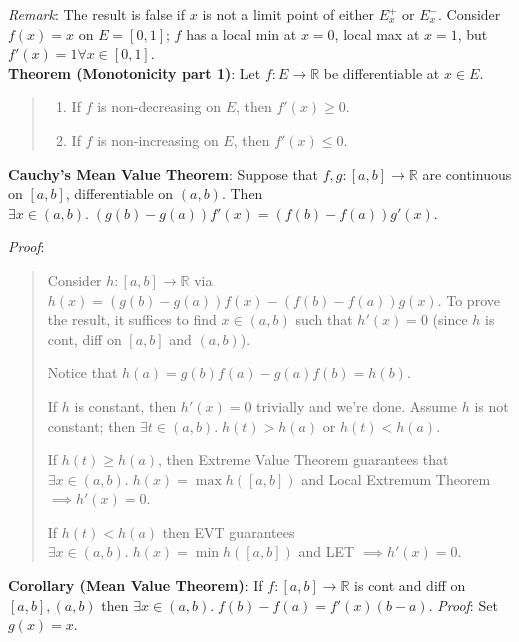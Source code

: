 \documentclass[11pt]{article}
\begin{document}
\emph{Remark}: The result is false if $x$ is not a limit point of either $E_x^+$ or $E_x^-$. Consider $f(x) = x$ on $E = [0,1]$; $f$ has a local min at $x = 0$, local max at $x = 1$, but $f'(x) = 1 \forall x \in [0, 1]$.\\

\textbf{Theorem (Monotonicity part 1)}: Let $f : E \to \mathbb{R}$ be differentiable at $x \in E$.
\begin{quote}\vspace{-0.3cm}
	\begin{enumerate}
	\item If $f$ is non-decreasing on $E$, then $f'(x) \geq 0$.
	\item If $f$ is non-increasing on $E$, then $f'(x) \leq 0$.
	\end{enumerate}
\end{quote}

\textbf{Cauchy's Mean Value Theorem}: Suppose that $f, g : [a,b] \to \mathbb{R}$ are continuous on $[a,b]$, differentiable on $(a,b)$. Then $\exists x \in (a,b).\; (g(b) - g(a)) f'(x) = (f(b) - f(a)) g'(x)$.

\emph{Proof}:
\begin{quote}\vspace{-0.3cm}
Consider $h : [a,b] \to \mathbb{R}$ via $h(x) = (g(b) - g(a)) f(x) - (f(b) - f(a)) g(x)$. To prove the result, it suffices to find $x \in (a,b)$ such that $h'(x) = 0$ (since $h$ is cont, diff on $[a,b]$ and $(a,b)$).

Notice that $h(a) = g(b) f(a) - g(a) f(b) = h(b)$.

If $h$ is constant, then $h'(x) = 0$ trivially and we're done. Assume $h$ is not constant; then $\exists t \in (a,b).\; h(t) > h(a)$ or $h(t) < h(a)$.

If $h(t) \geq h(a)$, then Extreme Value Theorem guarantees that $\exists x \in (a,b).\; h(x) = \max h([a,b])$ and Local Extremum Theorem $\implies h'(x) = 0$.

If $h(t) < h(a)$ then EVT guarantees $\exists x \in (a,b).\; h(x) = \min h([a,b])$ and LET $\implies h'(x) = 0$.
\end{quote}

\textbf{Corollary (Mean Value Theorem)}: If $f : [a,b] \to \mathbb{R}$ is cont and diff on $[a,b], (a,b)$ then $\exists x \in (a,b).\; f(b) - f(a) = f'(x) (b-a)$. \emph{Proof}: Set $g(x) = x$.
\end{document}
